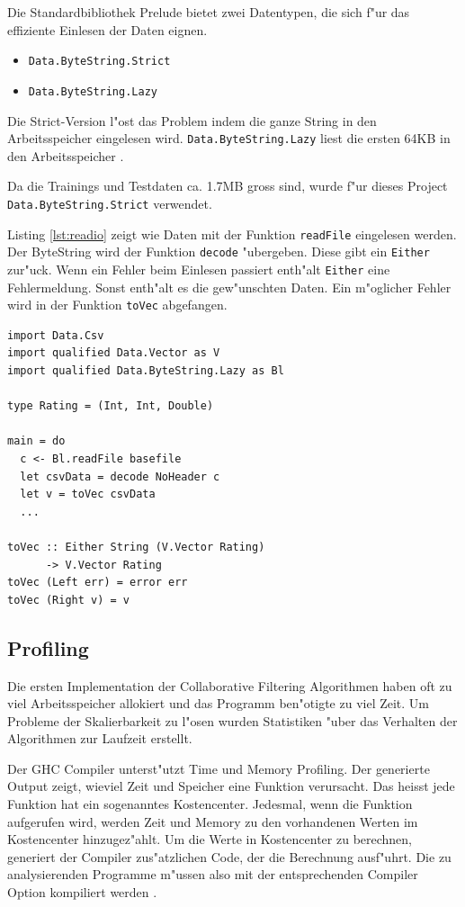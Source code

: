 \documentclass[a4paper, 12pt]{article}
\begin{document}
Die Standardbibliothek Prelude bietet zwei Datentypen, die sich f"ur das effiziente Einlesen der Daten eignen.

\begin{itemize}
\item \verb|Data.ByteString.Strict|
\item \verb|Data.ByteString.Lazy|
\end{itemize}

 Die Strict-Version l"ost das Problem indem die ganze String in den Arbeitsspeicher eingelesen wird. \verb|Data.ByteString.Lazy| liest die ersten 64KB in den Arbeitsspeicher \cite{Lipovaca}.

Da die Trainings und Testdaten ca. 1.7MB gross sind, wurde f"ur dieses Project \verb|Data.ByteString.Strict| verwendet.

Listing \ref{lst:readio} zeigt wie Daten mit der Funktion \verb|readFile| eingelesen werden. Der ByteString wird der Funktion \verb|decode| "ubergeben. Diese gibt ein \verb|Either| zur"uck. Wenn ein Fehler beim Einlesen passiert enth"alt \verb|Either| eine Fehlermeldung. Sonst enth"alt es die gew"unschten Daten. Ein m"oglicher Fehler wird in der Funktion \verb|toVec| abgefangen.

\begin{lstlisting}[label={lst:readio},caption={Einlesen von Files mit ByteString}]
import Data.Csv
import qualified Data.Vector as V
import qualified Data.ByteString.Lazy as Bl

type Rating = (Int, Int, Double)

main = do
  c <- Bl.readFile basefile
  let csvData = decode NoHeader c
  let v = toVec csvData
  ...

toVec :: Either String (V.Vector Rating)
      -> V.Vector Rating
toVec (Left err) = error err
toVec (Right v) = v
\end{lstlisting}

\subsection{Profiling}
\label{sec:profiling}

Die ersten Implementation der Collaborative Filtering Algorithmen haben oft zu viel Arbeitsspeicher allokiert und das Programm ben"otigte zu viel Zeit. Um Probleme der Skalierbarkeit zu l"osen wurden Statistiken "uber das Verhalten der Algorithmen zur Laufzeit erstellt.

Der GHC Compiler unterst"utzt Time und Memory Profiling. Der generierte Output zeigt, wieviel Zeit und Speicher eine Funktion verursacht. Das heisst jede Funktion hat ein sogenanntes Kostencenter. Jedesmal, wenn die Funktion aufgerufen wird, werden Zeit und Memory zu den vorhandenen Werten im Kostencenter hinzugez"ahlt. Um die Werte in Kostencenter zu berechnen, generiert der Compiler zus"atzlichen Code, der die Berechnung ausf"uhrt. Die zu analysierenden Programme m"ussen also mit der entsprechenden Compiler Option kompiliert werden \cite{Mena}.
\end{document}
